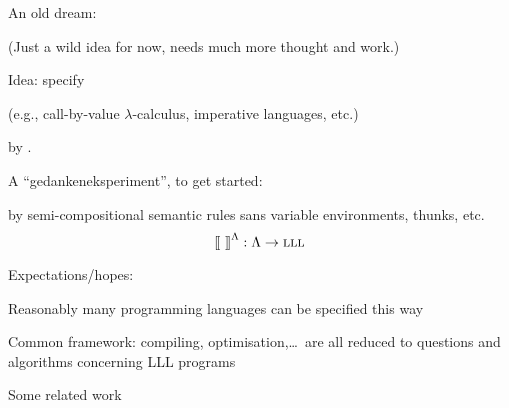 \documentclass[12pt,fleqn,landscape]{article}
\begin{document}
\begin{slide}{An old dream: \\
 }

(Just a wild idea for now, needs much more thought and work.)
\vair\vair

Idea: specify 
\vair

\hfill (e.g., call-by-value $\lambda$-calculus, imperative languages, etc.) 
\vair

by . 
\vair\vair

A ``gedankeneksperiment'', to get started: 
\vair\vair

by semi-compositional semantic rules sans variable environments, thunks, etc.
$$
\mbox{$\lbrack\hspace{-0.3ex}\lbrack$}\ \mbox{$\rbrack\hspace{-0.3ex}\rbrack$}^\Lambda : \Lambda \to \mbox{\sc lll}
$$


Expectations/hopes:
\bi

\item Reasonably many  programming languages can be specified this way


\item Common framework: compiling, optimisation,\ldots\ are all reduced to questions and algorithms  
concerning  LLL programs

 

\ei





\end{slide}




\begin{slide}{Some related work}

\vspace{-25mm}


\nocite{*}

\end{slide}

\end{document}
